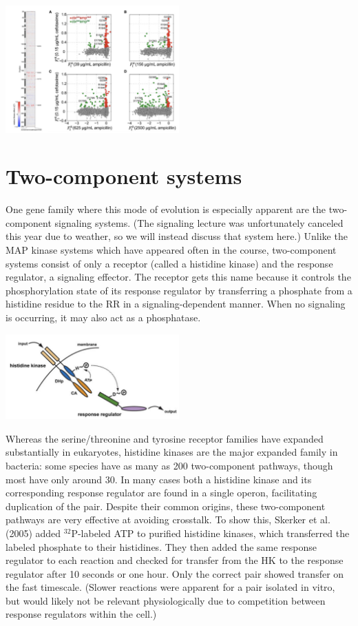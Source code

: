 \documentclass{article}
\begin{document}
\begin{center}
\includegraphics[width=0.5\textwidth]{stiffler_graphic.pdf}
\end{center}


\section*{Two-component systems}

One gene family where this mode of evolution is especially apparent are the two-component signaling systems. (The signaling lecture was unfortunately canceled this year due to weather, so we will instead discuss that system here.) Unlike the MAP kinase systems which have appeared often in the course, two-component systems consist of only a receptor (called a histidine kinase) and the response regulator, a signaling effector. The receptor gets this name because it controls the phosphorylation state of its response regulator by transferring a phosphate from a histidine residue to the RR in a signaling-dependent manner. When no signaling is occurring, it may also act as a phosphatase.

\begin{center}
\includegraphics[width=0.5\textwidth]{two_component_diagram.pdf}
\end{center}

Whereas the serine/threonine and tyrosine receptor families have expanded substantially in eukaryotes, histidine kinases are the major expanded family in bacteria: some species have as many as 200 two-component pathways, though most have only around 30. In many cases both a histidine kinase and its corresponding response regulator are found in a single operon, facilitating duplication of the pair. Despite their common origins, these two-component pathways are very effective at avoiding crosstalk.  To show this, Skerker et al. (2005) added $^{32}$P-labeled ATP to purified histidine kinases, which transferred the labeled phosphate to their histidines. They then added the same response regulator to each reaction and checked for transfer from the HK to the response regulator after 10 seconds or one hour. Only the correct pair showed transfer on the fast timescale. (Slower reactions were apparent for a pair isolated in vitro, but would likely not be relevant physiologically due to competition between response regulators within the cell.)
\end{document}
